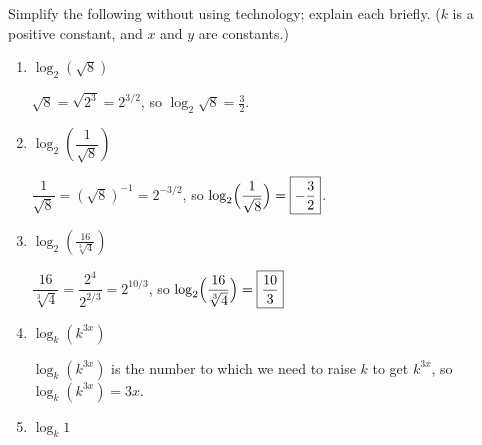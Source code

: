 \documentclass{article}
\begin{document}
\begin{enumerate}
  Simplify the following without using technology; explain each briefly. ($k$ is a positive constant, and $x$ and $y$ are constants.)

  \begin{enumerate}
  \item
    \begin{problem}[\vfill]
      $\log_2 \left( \sqrt{8} \right)$
    \end{problem}

    \begin{solution}
      $\sqrt{8} = \sqrt{2^3} = 2^{3/2}$, so $\log_2 \sqrt{8} = \boxed{\frac{3}{2}}$.
    \end{solution}

  \item
    \begin{problem}[\vfill]
      $\log_2 \left( \dfrac{1}{\sqrt{8}} \right)$
    \end{problem}

    \begin{solution}
      $\dfrac{1}{\sqrt{8}} = (\sqrt{8})^{-1} = 2^{-3/2}$, so
      $\log_2 \Bigl(\dfrac{1}{\sqrt{8}}\Bigr) = \boxed{-\frac{3}{2}}$.
    \end{solution}

  \item 
    \begin{problem}[\vfill]
      $\displaystyle \log_2\left({\frac{16}{\sqrt[3] 4}} \right)$
    \end{problem}

    \begin{solution}
      $\dfrac{16}{\sqrt[3]{4}} = \dfrac{2^4}{2^{2/3}} = 2^{10/3}$,
      so $\log_2\Bigl(\dfrac{16}{\sqrt[3]{4}}\Bigr) = \boxed{\frac{10}{3}}$
    \end{solution}

  \item
    \begin{problem}[\vfill]
      $\log_k \left( k^{3x} \right)$
    \end{problem}

    \begin{solution}
      $\log_k \left( k^{3x} \right)$ is the number to which we need to
      raise $k$ to get $k^{3x}$, so 
      $\log_k \left( k^{3x} \right)=\boxed{3x}$.
    \end{solution}

  \item
    \begin{problem}[\vfill]
      $ \log_k 1$
    \end{problem}


\end{enumerate}
\end{enumerate}
\end{document}
